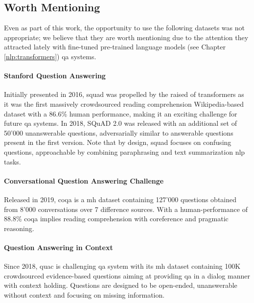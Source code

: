 \subsection{Worth Mentioning}
Even as part of this work, the opportunity to use the following datasets was not appropriate; we believe that they are worth mentioning due to the attention they attracted lately with fine-tuned pre-trained language models (see Chapter \ref{nlp:transformers}) \gls{qa} systems.

\paragraph{Stanford Question Answering}
\label{dataset:squad}
Initially presented in 2016, \gls{squad} \autocite{paper:journals/corr/RajpurkarZLL16} was propelled by the raised of \glspl{transformer} as it was the first massively crowdsourced reading comprehension Wikipedia-based dataset with a 86.6\% human performance, making it an exciting challenge for future \gls{qa} systems. In 2018, SQuAD 2.0 \autocite{paper:journals/corr/abs-1806-03822} was released with an additional set of 50'000 unanswerable questions, adversarially similar to answerable questions present in the first version. Note that by design, \gls{squad} focuses on confusing questions, approachable by combining paraphrasing and text summarization \gls{nlp} tasks.

\paragraph{Conversational Question Answering Challenge}
\label{dataset:coqa}
Released in 2019, \gls{coqa} \autocite{paper:journals/corr/abs-1808-07042} is a \gls{mh} dataset containing 127'000 questions obtained from 8'000 conversations over 7 difference sources. With a human-performance of 88.8\% \gls{coqa} implies reading comprehension with coreference and pragmatic reasoning.

\paragraph{Question Answering in Context}
Since 2018, \gls{quac} \autocite{paper:journals/corr/abs-1808-07036} is challenging \gls{qa} system with its \gls{mh} dataset containing 100K crowdsourced evidence-based questions aiming at providing \gls{qa} in a dialog manner with context holding. Questions are designed to be open-ended, unanswerable without context and focusing on missing information.

